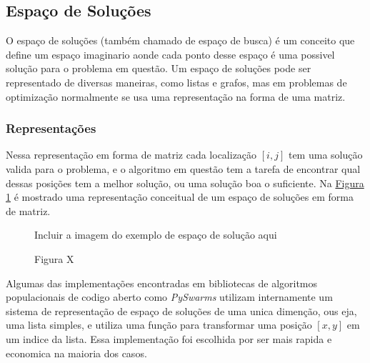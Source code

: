     \subsection{Espaço de Soluções}
        O espaço de soluções (também chamado de espaço de busca) é um conceito que define um espaço imaginario aonde cada ponto desse espaço é uma possivel solução para o problema em questão. Um espaço de soluções pode ser representado de diversas maneiras, como listas e grafos, mas em problemas de optimização normalmente se usa uma representação na forma de uma matriz.\newline
        

        \subsubsection{Representações}
            Nessa representação em forma de matriz cada localização $[i, j]$ tem uma solução valida para o problema, e o algoritmo em questão tem a tarefa de encontrar qual dessas posições tem a melhor solução, ou uma solução boa o suficiente. Na 
            \hyperref[fig:solution-space]{Figura \ref{fig:solution-space}} 
            é mostrado uma representação conceitual de um espaço de soluções em forma de matriz.\newline
            
            \begin{figure}[h]
                \centering
                \small{Incluir a imagem do exemplo de espaço de solução aqui}
                \caption{Figura X}
                \label{fig:solution-space}
            \end{figure}

            Algumas das implementações encontradas em bibliotecas de algoritmos populacionais de codigo aberto como \textit{PySwarms} utilizam internamente um sistema de representação de espaço de soluções de uma unica dimenção, ous eja, uma lista simples, e utiliza uma função para transformar uma posição $[x,y]$ em um indice da lista. Essa implementação foi escolhida por ser mais rapida e economica na maioria dos casos. \newline

        

